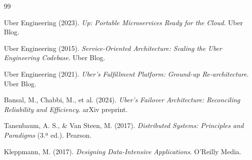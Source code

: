 \documentclass[12pt,a4paper]{article}
\begin{document}
\newpage
\begin{thebibliography}{99}

Uber Engineering (2023).
\textit{Up: Portable Microservices Ready for the Cloud}.
Uber Blog.

Uber Engineering (2015).
\textit{Service-Oriented Architecture: Scaling the Uber Engineering Codebase}.
Uber Blog.

Uber Engineering (2021).
\textit{Uber's Fulfillment Platform: Ground-up Re-architecture}.
Uber Blog.

Bansal, M., Chabbi, M., et al. (2024).
\textit{Uber's Failover Architecture: Reconciling Reliability and Efficiency}.
arXiv preprint.

Tanenbaum, A. S., \& Van Steen, M. (2017).
\textit{Distributed Systems: Principles and Paradigms} (3.ª ed.).
Pearson.

Kleppmann, M. (2017).
\textit{Designing Data-Intensive Applications}.
O'Reilly Media.

\end{thebibliography}
\end{document}
